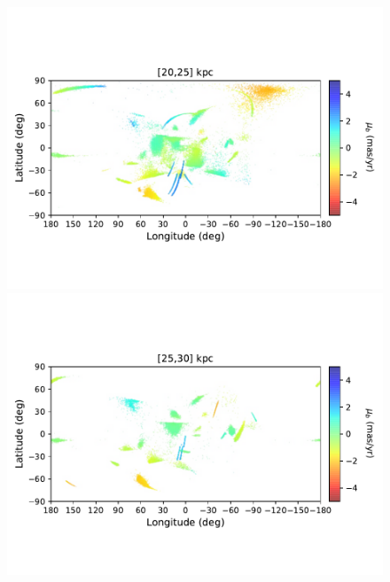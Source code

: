 \begin{figure}[h!]
\begin{center}
            \includegraphics[clip=true, trim = 0mm 20mm 0mm 20mm, width=\columnwidth]{images/PII_ensemble_LB_D20-25_PMB_new.pdf}
            \includegraphics[clip=true, trim = 0mm 20mm 0mm 20mm, width=\columnwidth]{images/PII_ensemble_LB_D25-30_PMB_new.pdf}


\end{center}
\end{figure}
